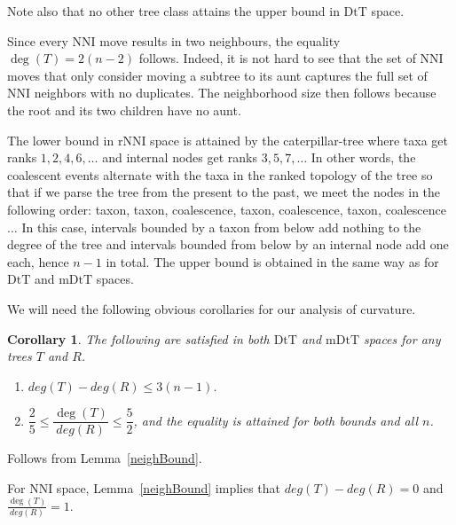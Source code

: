 \documentclass{amsart}
\newtheorem{corollary}[lemma]{Corollary}
\newcommand{\dts}{\mathrm{DtT}}
\newcommand{\nni}{\mathrm{NNI}}
\newcommand{\rnni}{\mathrm{rNNI}}
\newcommand{\mdts}{\mathrm{mDtT}}
\begin{document}
Note also that no other tree class attains the upper bound in $\dts$ space.

Since every NNI move results in two neighbours, the equality $\deg(T) = 2(n-2)$ follows.
Indeed, it is not hard to see that the set of NNI moves that only consider moving a subtree to its aunt captures the full set of NNI neighbors with no duplicates.
The neighborhood size then follows because the root and its two children have no aunt.

The lower bound in $\rnni$ space is attained by the caterpillar-tree where taxa get ranks $1, 2, 4, 6, \ldots$ and internal nodes get ranks $3, 5, 7, \ldots$
In other words, the coalescent events alternate with the taxa in the ranked topology of the tree so that if we parse the tree from the present to the past, we meet the nodes in the following order: taxon, taxon, coalescence, taxon, coalescence, taxon, coalescence$\ldots$
In this case, intervals bounded by a taxon from below add nothing to the degree of the tree and intervals bounded from below by an internal node add one each, hence $n-1$ in total.
The upper bound is obtained in the same way as for $\dts$ and $\mdts$ spaces.
\endproof

We will need the following obvious corollaries for our analysis of curvature.

\begin{corollary}\label{degreeBounds}
The following are satisfied in both $\dts$ and $\mdts$ spaces for any trees $T$ and $R$.
\begin{enumerate}[(1)]
\item $deg(T)-deg(R) \leq 3(n-1)$.
\item $\dfrac25 \leq \dfrac{\deg(T)}{deg(R)} \leq \dfrac52$, and the equality is attained for both bounds and all $n$.
\end{enumerate}
\end{corollary}

\proof
Follows from Lemma~\ref{neighBound}.
\endproof

For $\nni$ space, Lemma~\ref{neighBound} implies that $deg(T)-deg(R) = 0$ and $\frac{\deg(T)}{deg(R)} = 1$.
\end{document}
